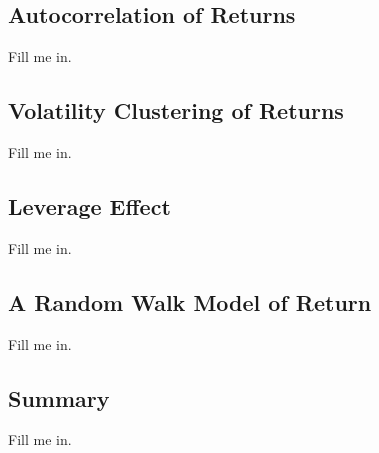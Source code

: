 \documentclass[11pt]{article}
\theoremstyle{definition}
\begin{document}
\subsection{Autocorrelation of Returns}\label{sec:autocorrelation-of-returns}
Fill me in.

\subsection{Volatility Clustering of Returns}\label{sec:volatility-clustering-of-returns}
Fill me in.

\subsection{Leverage Effect}\label{sec:leverage-effect}
Fill me in.

\subsection{A Random Walk Model of Return}\label{sec:random-walk-model-of-return}
Fill me in.

\subsection{Summary}\label{sec:summary-stylized-facts}
Fill me in.
\end{document}
